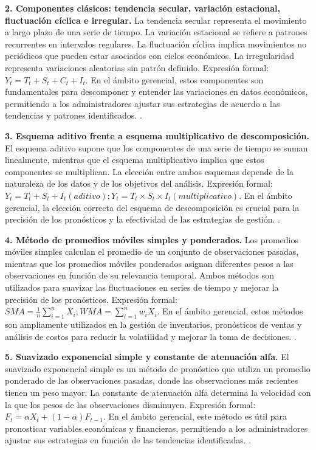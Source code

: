 {\textbf{2. Componentes clásicos: tendencia secular, variación estacional, fluctuación cíclica e irregular.} La tendencia secular representa el movimiento a largo plazo de una serie de tiempo. La variación estacional se refiere a patrones recurrentes en intervalos regulares. La fluctuación cíclica implica movimientos no periódicos que pueden estar asociados con ciclos económicos. La irregularidad representa variaciones aleatorias sin patrón definido. Expresión formal: $Y_t = T_t + S_t + C_t + I_t$. En el ámbito gerencial, estos componentes son fundamentales para descomponer y entender las variaciones en datos económicos, permitiendo a los administradores ajustar sus estrategias de acuerdo a las tendencias y patrones identificados. \citep{anderson2012,lind2012,wackerly2010}.

\textbf{3. Esquema aditivo frente a esquema multiplicativo de descomposición.} El esquema aditivo supone que los componentes de una serie de tiempo se suman linealmente, mientras que el esquema multiplicativo implica que estos componentes se multiplican. La elección entre ambos esquemas depende de la naturaleza de los datos y de los objetivos del análisis. Expresión formal: $Y_t = T_t + S_t + I_t (aditivo); Y_t = T_t \times S_t \times I_t (multiplicativo)$. En el ámbito gerencial, la elección correcta del esquema de descomposición es crucial para la precisión de los pronósticos y la efectividad de las estrategias de gestión. \citep{anderson2012,lind2012,wackerly2010}.

\textbf{4. Método de promedios móviles simples y ponderados.} Los promedios móviles simples calculan el promedio de un conjunto de observaciones pasadas, mientras que los promedios móviles ponderados asignan diferentes pesos a las observaciones en función de su relevancia temporal. Ambos métodos son utilizados para suavizar las fluctuaciones en series de tiempo y mejorar la precisión de los pronósticos. Expresión formal: $SMA = \frac{1}{n}\sum_{i=1}^{n} X_i; WMA = \sum_{i=1}^{n} w_i X_i$. En el ámbito gerencial, estos métodos son ampliamente utilizados en la gestión de inventarios, pronósticos de ventas y análisis de costos para reducir la volatilidad y mejorar la toma de decisiones. \citep{anderson2012,lind2012,wackerly2010}.

\textbf{5. Suavizado exponencial simple y constante de atenuación alfa.} El suavizado exponencial simple es un método de pronóstico que utiliza un promedio ponderado de las observaciones pasadas, donde las observaciones más recientes tienen un peso mayor. La constante de atenuación alfa determina la velocidad con la que los pesos de las observaciones disminuyen. Expresión formal: $F_t = \alpha X_t + (1-\alpha) F_{t-1}$. En el ámbito gerencial, este método es útil para pronosticar variables económicas y financieras, permitiendo a los administradores ajustar sus estrategias en función de las tendencias identificadas. \citep{anderson2012,lind2012,wackerly2010}.

}
